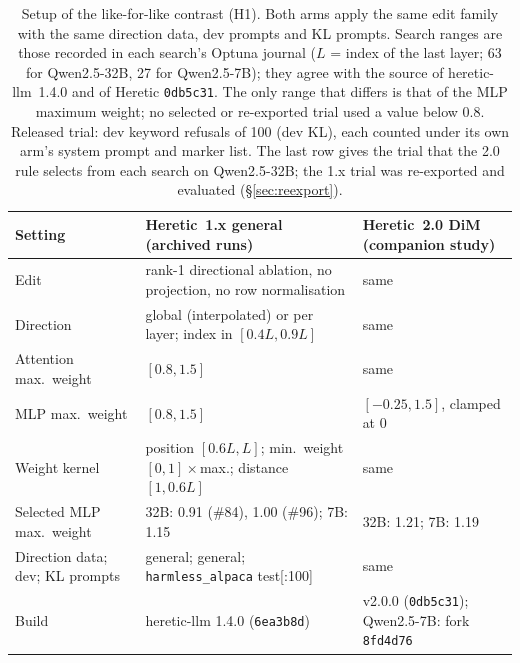 \begin{table}[tbp]
\centering\small
\caption{Setup of the like-for-like contrast (H1). Both arms apply the same edit family with the same direction
data, dev prompts and KL prompts. Search ranges are those recorded in each search's Optuna journal ($L$ = index of
the last layer; 63 for Qwen2.5-32B, 27 for Qwen2.5-7B); they agree with the source of heretic-llm~1.4.0 and of
Heretic \texttt{0db5c31}. The only range that differs is that of the MLP maximum weight; no selected or re-exported
trial used a value below 0.8. Released trial: dev keyword refusals of 100 (dev KL), each counted under its own arm's
system prompt and marker list. The last row gives the trial that the 2.0 rule selects from each search on
Qwen2.5-32B; the 1.x trial was re-exported and evaluated (\S\ref{sec:reexport}).}
\label{tab:h1setup}
\setlength{\tabcolsep}{4pt}
\begin{tabular}{@{}>{\raggedright\arraybackslash}p{3.0cm}>{\raggedright\arraybackslash}p{5.2cm}%
>{\raggedright\arraybackslash}p{5.2cm}@{}}
\toprule
Setting & Heretic~1.x general (archived runs) & Heretic~2.0 DiM (companion study) \\
\midrule
Edit & rank-1 directional ablation, no projection, no row normalisation & same \\
Direction & global (interpolated) or per layer; index in $[0.4L, 0.9L]$ & same \\
Attention max.\ weight & $[0.8, 1.5]$ & same \\
MLP max.\ weight & $[0.8, 1.5]$ & $[-0.25, 1.5]$, clamped at 0 \\
Weight kernel & position $[0.6L, L]$; min.\ weight $[0, 1]\times$max.; distance $[1, 0.6L]$ & same \\
Selected MLP max.\ weight & 32B: 0.91 (\#84), 1.00 (\#96); 7B: 1.15 & 32B: 1.21; 7B: 1.19 \\
Direction data; dev; KL prompts & general; general; \texttt{harmless\_alpaca} test[:100] & same \\
Build & heretic-llm 1.4.0 (\texttt{6ea3b8d}) & v2.0.0 (\texttt{0db5c31}); Qwen2.5-7B: fork
\texttt{8fd4d76} \\

\end{tabular}
\end{table}
